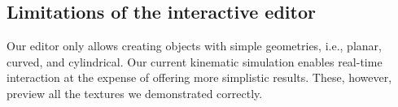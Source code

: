 \subsection{Limitations of the interactive editor}

Our editor only allows creating objects with simple geometries, i.e., planar, curved, and cylindrical. Our current kinematic simulation enables real-time interaction at the expense of offering more simplistic results. These, however, preview all the textures we demonstrated correctly. 












